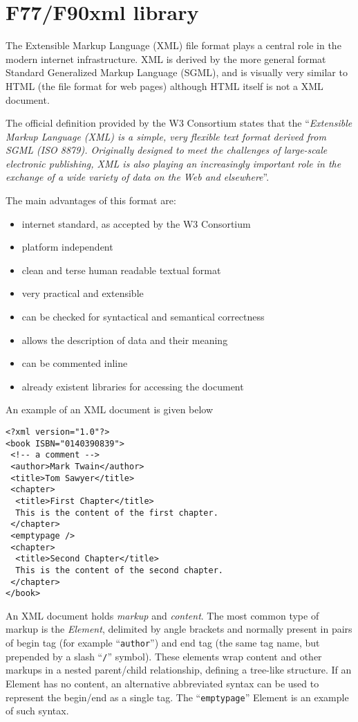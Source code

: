 \section{F77/F90xml library}

The Extensible Markup Language (XML) file format plays a central role in the
modern internet infrastructure. XML is derived by the more general format
Standard Generalized Markup Language (SGML), and is visually very similar to
HTML (the file format for web pages) although HTML itself is not a XML
document. 

The official definition provided by the W3 Consortium\cite{w3c-site} states
that the ``\textit{Extensible Markup Language (XML) is a simple, very flexible text
format derived from SGML (ISO 8879).  Originally designed to meet the
challenges of large-scale electronic publishing, XML is also playing an
increasingly important role in the exchange of a wide variety of data on the
Web and elsewhere}''.

The main advantages of this format are:
\begin{itemize}
\item internet standard, as accepted by the W3 Consortium
\item platform independent
\item clean and terse human readable textual format
\item very practical and extensible
\item can be checked for syntactical and semantical correctness
\item allows the description of data and their meaning
\item can be commented inline
\item already existent libraries for accessing the document
\end{itemize}

An example of an XML document is given below

\begin{verbatim}
<?xml version="1.0"?>
<book ISBN="0140390839">
 <!-- a comment -->
 <author>Mark Twain</author>
 <title>Tom Sawyer</title>
 <chapter>
  <title>First Chapter</title>
  This is the content of the first chapter.
 </chapter>
 <emptypage />
 <chapter>
  <title>Second Chapter</title>
  This is the content of the second chapter.
 </chapter>
</book>
\end{verbatim}

An XML document holds \textit{markup} and \textit{content}. The most common type of markup is
the \textit{Element}, delimited by angle brackets and normally present in pairs of
begin tag (for example ``\texttt{author}'') and end tag (the same tag name, but
prepended by a slash ``\texttt{/}'' symbol). These elements wrap content and other
markups in a nested parent/child relationship, defining a tree-like
structure. If an Element has no content, an alternative abbreviated syntax
can be used to represent the begin/end as a single tag. The
``\texttt{emptypage}'' Element is an example of such syntax.

